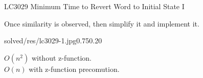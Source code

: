 \begin{problem}{LC3029 Minimum Time to Revert Word to Initial State I}
    
\end{problem}


    \begin{solution}[$O(n^2), O(n)$]
        

        Once similarity is observed, then simplify it and implement it.

        \begin{lfigurecp}{solved/res/lc3029-1.jpg}{0.75}{0.20}
            
            $O(n^2)$ without z-function.\\
            $O(n)$ with z-function precomution.
            

        \end{lfigurecp}
        
    \end{solution}